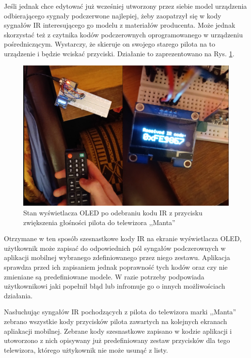 \documentclass[12pt,twoside]{article}
\begin{document}
Jeśli jednak chce edytować już wcześniej utworzony przez siebie model urządzenia odbierającego sygnały podczerwone najlepiej, żeby zaopatrzył się w kody sygnałów IR interesującego go modelu z materiałów producenta. Może jednak skorzystać też z czytnika kodów podczerownych oprogramowanego w urządzeniu pośredniczącym. Wystarczy, że skieruje on swojego starego pilota na to urządzenie i będzie wciskać przyciski. Działanie to zaprezentowano na Rys. \ref*{Fig:irCodeRemote}.

\begin{figure}[ht]
   \centering
   \includegraphics[width=14cm]{images/irCodeRemote.png}
   \caption{Stan wyświetlacza OLED po odebraniu kodu IR z przycisku zwiększenia głośności pilota do telewizora ,,Manta''}
   \label{Fig:irCodeRemote}
\end{figure}

 Otrzymane w ten sposób szesnastkowe kody IR na ekranie wyświetlacza OLED, użytkownik może zapisać do odpowiednich pól syngałów podczerownych w aplikacji mobilnej wybranego zdefiniowanego przez niego zestawu. Aplikacja sprawdza przed ich zapisaniem jednak poprawność tych kodów oraz czy nie zmieniane są predefiniowane modele. W razie potrzeby podpowiada użytkownikowi jaki popełnił błąd lub infromuje go o innych możliwościach działania.

 Nasłuchując syngałów IR pochodzących z pilota do telewizora marki ,,Manta'' zebrano wszystkie kody przycisków pilota zawartych na kolejnych ekranach apliakacji mobilnej. Zebrane kody szesnastkowe zapisano w kodzie aplikacji i utoworzono z nich opisywany już predefiniowany zestaw przycisków dla tego telewizora, którego użtykownik nie może usunąć z listy.
\end{document}
